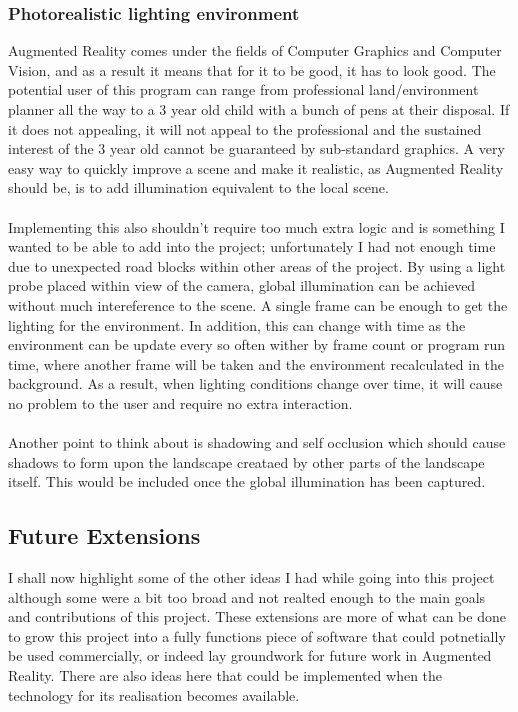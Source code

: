 \documentclass[11pt]{article}
\begin{document}
\subsubsection{Photorealistic lighting environment}
Augmented Reality comes under the fields of Computer Graphics and Computer
Vision, and as a result it means that for it to be good, it has to look good.
The potential user of this program can range from professional land/environment
planner all the way to a 3 year old child with a bunch of pens at their 
disposal. If it does not appealing, it will not appeal to the professional
and the sustained interest of the 3 year old cannot be guaranteed by 
sub-standard graphics. A very easy way to quickly improve a scene and make it
realistic, as Augmented Reality should be, is to add illumination equivalent 
to the local scene. \\
\\
Implementing this also shouldn't require too much extra logic and is something
I wanted to be able to add into the project; unfortunately I had not
enough time due to unexpected road blocks within other areas of the project.
By using a light probe placed within view of the camera, global illumination
can be achieved without much intereference to the scene. A single frame can be
enough to get the lighting for the environment. In addition, this can change 
with time as the environment can be update every so often wither by frame count
or program run time, where another frame will be taken and the environment 
recalculated in the background. As a result, when lighting conditions change
over time, it will cause no problem to the user and require no extra interaction.\\
\\
Another point to think about is shadowing and self occlusion which should 
cause shadows to form upon the landscape creataed by other parts of the landscape
itself. This would be included once the global illumination has been captured.

\subsection{Future Extensions}
I shall now highlight some of the other ideas I had while going into this 
project although some were a bit too broad and not realted enough to the main
goals and contributions of this project. These extensions are more of what
can be done to grow this project into a fully functions piece of software that
could potnetially be used commercially, or indeed lay groundwork for future
work in Augmented Reality. There are also ideas here that could be implemented
when the technology for its realisation becomes available.
\end{document}
